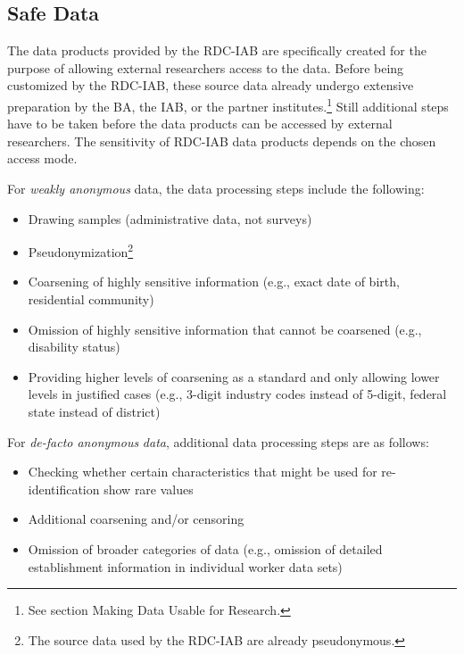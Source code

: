 \hypertarget{safe-data}{%
\subsection{Safe Data}\label{safe-data}}

The data products provided by the RDC-IAB are specifically created for the purpose of allowing external researchers access to the data. Before being customized by the RDC-IAB, these source data already undergo extensive preparation by the BA, the IAB, or the partner institutes.\footnote{See section Making Data Usable for Research.} Still additional steps have to be taken before the data products can be accessed by external researchers. The sensitivity of RDC-IAB data products depends on the chosen access mode.

For \emph{weakly anonymous} data, the data processing steps include the following:

\begin{itemize}
\tightlist
\item
  Drawing samples (administrative data, not surveys)
\item
  Pseudonymization\footnote{The source data used by the RDC-IAB are already pseudonymous.}
\item
  Coarsening of highly sensitive information (e.g., exact date of birth, residential community)
\item
  Omission of highly sensitive information that cannot be coarsened (e.g., disability status)
\item
  Providing higher levels of coarsening as a standard and only allowing lower levels in justified cases (e.g., 3-digit industry codes instead of 5-digit, federal state instead of district)
\end{itemize}

For \emph{de-facto anonymous} \emph{data}, additional data processing steps are as follows:

\begin{itemize}
\tightlist
\item
  Checking whether certain characteristics that might be used for re-identification show rare values
\item
  Additional coarsening and/or censoring
\item
  Omission of broader categories of data (e.g., omission of detailed establishment information in individual worker data sets)
\end{itemize}

